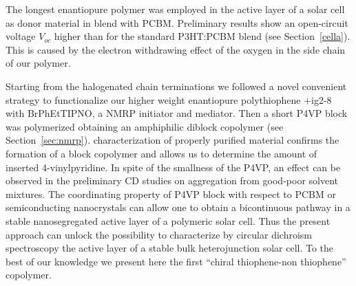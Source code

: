 The longest enantiopure polymer was employed in the active layer of a solar cell as donor material in blend with \gls{PCBM}. Preliminary results show an open-circuit voltage $V_{oc}$ higher than for the standard \gls{P3HT}:\-\gls{PCBM} blend (see Section~\ref{cella}). This is caused by the electron withdrawing effect of the oxygen in the side chain of our polymer. 

Starting from the halogenated chain terminations we followed a novel convenient strategy to functionalize our higher weight enantiopure polythiophene \cmpd+{ig2-8} with \gls{BrPhEtTIPNO}, a \acrfull{NMRP} initiator and mediator. Then a short \acrfull{P4VP} block was polymerized obtaining an amphiphilic diblock copolymer (see Section~\ref{sec:nmrp}). {\HNMR} characterization of properly purified material confirms the formation of a block copolymer and allows us to determine the amount of inserted 4-vinyl\-pyridine. 
In spite of the smallness of the \gls{P4VP}, an effect can be observed in the preliminary \gls{CD} studies on aggregation from good-poor solvent mixtures. The coordinating property of \gls{P4VP} block with respect to \gls{PCBM} or semi\-conducting nano\-crystals can allow one to obtain a bi\-continuous pathway in a stable nano\-segregated active layer of a polymeric solar cell. Thus the present approach can unlock the possibility to characterize by circular dichroism spectroscopy the active layer of a stable bulk heterojunction solar cell. 
To the best of our knowledge we present here the first ``chiral thiophene-non thiophene'' copolymer. 